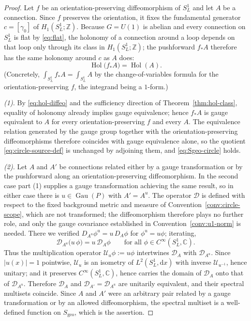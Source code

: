 \documentclass[11pt,a4paper]{article}
\theoremstyle{plain}
\theoremstyle{definition}
\theoremstyle{remark}
\newcommand{\Int}{\mathbb{Z}}
\newcommand{\Cx}{\mathbb{C}}
\newcommand{\Sgeo}{S_{\mathrm{geo}}}
\newcommand{\Gau}{\operatorname{Gau}}
\newcommand{\Hol}{\operatorname{Hol}}
\begin{document}
\begin{proof}
Let $f$ be an orientation-preserving diffeomorphism of $S^1_L$ and let $A$ be a connection. Since
$f$ preserves the orientation, it fixes the fundamental generator $c=[\gamma_0]$ of
$H_1(S^1_L;\Int)$. Because $G=U(1)$ is abelian and every connection on $S^1_L$ is flat by
\eqref{eq:flat}, the holonomy of a connection around a loop depends on that loop only through its
class in $H_1(S^1_L;\Int)$; the pushforward $f_*A$ therefore has the same holonomy around $c$ as
$A$ does:
\begin{equation}
\label{eq:hol-diffeo}
\Hol\bigl(f_*A\bigr)=\Hol(A) .
\end{equation}
(Concretely, $\int_{S^1_L} f_*A=\int_{S^1_L}A$ by the change-of-variables formula for the
orientation-preserving $f$, the integrand being a $1$-form.)

\emph{(1).} By \eqref{eq:hol-diffeo} and the sufficiency direction of Theorem~\ref{thm:hol-class},
equality of holonomy already implies gauge equivalence; hence $f_*A$ is gauge equivalent to $A$ for
every orientation-preserving $f$ and every $A$. The equivalence relation generated by the gauge
group together with the orientation-preserving diffeomorphisms therefore coincides with gauge
equivalence alone, so the quotient \eqref{eq:circle-source-def} is unchanged by adjoining them, and
\eqref{eq:Sgeo-circle} holds.

\emph{(2).} Let $A$ and $A'$ be connections related either by a gauge transformation or by the
pushforward along an orientation-preserving diffeomorphism. In the second case part (1) supplies a
gauge transformation achieving the same result, so in either case there is $u\in\Gau(P)$ with
$A'=A^{u}$. The operator $\mathcal{D}$ is defined with respect to the fixed background metric and
measure of Convention~\ref{conv:circle-scope}, which are not transformed; the diffeomorphism
therefore plays no further role, and only the gauge covariance established in
Convention~\ref{conv:u1-norm} is needed. There we verified
$D_{A^{u}}\phi^{u}=u\,D_A\phi$ for $\phi^{u}=u\phi$; iterating,
\[
\mathcal{D}_{A^{u}}\bigl(u\,\phi\bigr)
=u\,\mathcal{D}_{A}\phi
\qquad\text{for all }\phi\in C^\infty(S^1_L,\Cx).
\]
Thus the multiplication operator $\mathcal{U}_u\phi:=u\phi$ intertwines $\mathcal{D}_A$ with
$\mathcal{D}_{A^{u}}$. Since $|u(x)|=1$ pointwise, $\mathcal{U}_u$ is an isometry of
$L^2(S^1_L,\mathrm{d}x)$ with inverse $\mathcal{U}_{u^{-1}}$, hence unitary; and it preserves
$C^\infty(S^1_L,\Cx)$, hence carries the domain of $\mathcal{D}_A$ onto that of
$\mathcal{D}_{A^{u}}$. Therefore $\mathcal{D}_{A}$ and $\mathcal{D}_{A'}=\mathcal{D}_{A^{u}}$ are
unitarily equivalent, and their spectral multisets coincide. Since $A$ and $A'$ were an arbitrary
pair related by a gauge transformation or by an allowed diffeomorphism, the spectral multiset is a
well-defined function on $\Sgeo$, which is the assertion.
\end{proof}
\end{document}
